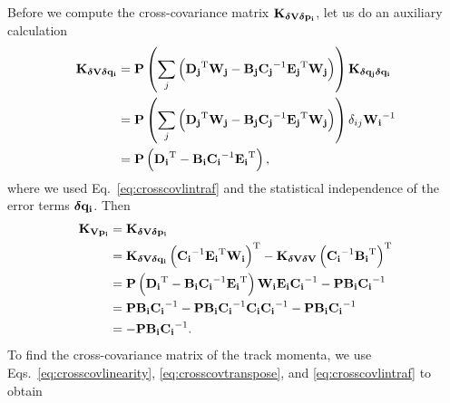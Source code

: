 \documentclass[12pt,a4paper]{scrarticle}
\begin{document}
%
Before we compute the cross-covariance matrix $\mathbf{K}_{\mathbf{\bm{\delta} \mathbf{V}} \mathbf{\bm{\delta} \mathbf{p_{i}}}}$, let us do an auxiliary calculation 
\begin{align*}
    \mathbf{K}_{\mathbf{\bm{\delta} \mathbf{V}} \mathbf{\bm{\delta} \mathbf{q_{i}}}} 
        &= \mathbf{P} \left(\sum_j \left(\mathbf{D_{j}}^{\mathrm{T}} \mathbf{W_{j}} - \mathbf{B_{j}} \mathbf{C_{j}}^{-1} \mathbf{E_{j}}^{\mathrm{T}} \mathbf{W_{j}}\right)\right) \mathbf{K}_{\mathbf{\bm{\delta} \mathbf{q_{j}}} \mathbf{\bm{\delta} \mathbf{q_{i}}}} \\
        &= \mathbf{P} \left(\sum_j \left(\mathbf{D_{j}}^{\mathrm{T}} \mathbf{W_{j}} - \mathbf{B_{j}} \mathbf{C_{j}}^{-1} \mathbf{E_{j}}^{\mathrm{T}} \mathbf{W_{j}}\right)\right) \delta_{ij} \mathbf{W_{i}}^{-1} \\
        &= \mathbf{P} \left(\mathbf{D_{i}}^{\mathrm{T}} - \mathbf{B_{i}} \mathbf{C_{i}}^{-1} \mathbf{E_{i}}^{\mathrm{T}}\right),
\end{align*}
where we used Eq.~\ref{eq:crosscovlintraf} and the statistical independence of the error terms $\bm{\delta} \mathbf{q_{i}}$. Then 
\begin{align*}
    \mathbf{K}_{\mathbf{V} \mathbf{p_i}} 
        &= \mathbf{K}_{\mathbf{\bm{\delta} \mathbf{V}} \mathbf{\bm{\delta} \mathbf{p_{i}}}} \\
        &= \mathbf{K}_{\mathbf{\bm{\delta} \mathbf{V}} \mathbf{\bm{\delta} \mathbf{q_{i}}}} \left( \mathbf{C_{i}}^{-1} \mathbf{E_{i}}^{\mathrm{T}} \mathbf{W_{i}} \right)^{\mathrm{T}} - \mathbf{K}_{\mathbf{\bm{\delta} \mathbf{V}} \mathbf{\bm{\delta} \mathbf{V}}} \left( \mathbf{C_{i}}^{-1} \mathbf{B_{i}}^{\mathrm{T}} \right)^{\mathrm{T}} \\
        &= \mathbf{P} \left(\mathbf{D_{i}}^{\mathrm{T}} - \mathbf{B_{i}} \mathbf{C_{i}}^{-1} \mathbf{E_{i}}^{\mathrm{T}}\right) \mathbf{W_{i}} \mathbf{E_{i}} \mathbf{C_{i}}^{-1} - \mathbf{P} \mathbf{B_{i}} \mathbf{C_{i}}^{-1} \\
        &= \mathbf{P} \mathbf{B_{i}} \mathbf{C_{i}}^{-1} - \mathbf{P} \mathbf{B_{i}} \mathbf{C_{i}}^{-1} 
        \mathbf{C_{i}} \mathbf{C_{i}}^{-1} - \mathbf{P} \mathbf{B_{i}} \mathbf{C_{i}}^{-1} \\
        &= - \mathbf{P} \mathbf{B_{i}} \mathbf{C_{i}}^{-1}.
\end{align*}
%
To find the cross-covariance matrix of the track momenta, we use Eqs.~\ref{eq:crosscovlinearity}, \ref{eq:crosscovtranspose}, and \ref{eq:crosscovlintraf} to obtain
\end{document}
